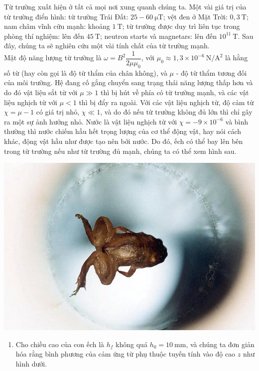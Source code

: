 \begin{vd}[Magnetars]
Từ trường xuất hiện ở tất cả mọi nơi xung quanh chúng ta. Một vài giá trị của từ trường điển hình: từ trường Trái Đất: $25-60~\mathrm{\mu T}$; vệt đen ở Mặt Trời: $0,3~\mathrm{T}$; nam châm vĩnh cữu mạnh: khoảng $1~\mathrm{T}$; từ trường được duy trì liên tục trong phòng thí nghiệm: lên đến $45~\mathrm{T}$; neutron starts và magnetars: lên đến $10^{11}~\mathrm{T}$. Sau đây, chúng ta sẽ nghiên cứu một vài tính chất của từ trường mạnh.\\
Mật độ năng lượng từ trường là $\omega=B^2\dfrac{1}{2\mu \mu_0}$, với $\mu_0\approx1,3\times 10^{-6}~\mathrm{N/A^2}$ là hằng số từ (hay còn gọi là độ từ thẩm của chân không), và $\mu$ - độ từ thẩm tương đối của môi trường. Hệ đang cố gắng chuyển sang trạng thái năng lượng thấp hơn và do đó vật liệu sắt từ với $\mu \gg 1$ thì bị hút về phía có từ trường mạnh, và các vật liệu nghịch từ với $\mu < 1$ thì bị đẩy ra ngoài. Với các vật liệu nghịch từ, độ cảm từ $\chi=\mu -1$ có giá trị nhỏ, $\chi \ll 1$, và do đó nếu từ trường không đủ lớn thì chỉ gây ra một sự ảnh hưởng nhỏ. Nước là vật liệu nghịch từ với $\chi=-9\times10^{-6}$ và bình thường thì nước chiếm hầu hết trọng lượng của cơ thể động vật, hay nói cách khác, động vật hầu như được tạo nên bởi nước. Do đó, ếch có thể bay lên bên trong từ trường nếu như từ trường đủ mạnh, chúng ta có thể xem hình sau.
\begin{center}
\includegraphics[scale=0.4]{Anh/2016.3.1.jpg}
\end{center}
\begin{enumerate}[1)]
    \item Cho chiều cao của con ếch là $h_{f}$ không quá $h_0=10~\mathrm{mm}$, và chúng ta đơn giản hóa rằng bình phương của cảm ứng từ phụ thuộc tuyến tính vào độ cao $z$ như hình dưới. 
    \begin{center}


\end{center}
\end{enumerate}
\end{vd}
